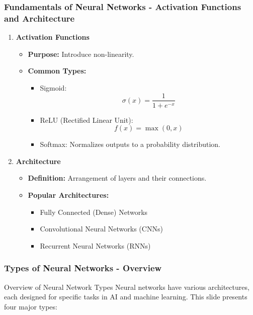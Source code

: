 \documentclass[aspectratio=169]{beamer}
\begin{document}
\begin{frame}[fragile]
    \frametitle{Fundamentals of Neural Networks - Activation Functions and Architecture}

    \begin{enumerate}[resume]
        \item \textbf{Activation Functions}
        \begin{itemize}
            \item \textbf{Purpose:} Introduce non-linearity.
            \item \textbf{Common Types:}
            \begin{itemize}
                \item Sigmoid: 
                \begin{equation}
                    \sigma(x) = \frac{1}{1 + e^{-x}}
                \end{equation}
                \item ReLU (Rectified Linear Unit):
                \begin{equation}
                    f(x) = \max(0, x)
                \end{equation}
                \item Softmax: Normalizes outputs to a probability distribution.
            \end{itemize}
        \end{itemize}

        \item \textbf{Architecture}
        \begin{itemize}
            \item \textbf{Definition:} Arrangement of layers and their connections.
            \item \textbf{Popular Architectures:}
            \begin{itemize}
                \item Fully Connected (Dense) Networks
                \item Convolutional Neural Networks (CNNs)
                \item Recurrent Neural Networks (RNNs)
            \end{itemize}
        \end{itemize}
    \end{enumerate}
\end{frame}

\begin{frame}[fragile]
    \frametitle{Types of Neural Networks - Overview}
    \begin{block}{Overview of Neural Network Types}
        Neural networks have various architectures, each designed for specific tasks in AI and machine learning. This slide presents four major types:
    \end{block}
\end{frame}
\end{document}
